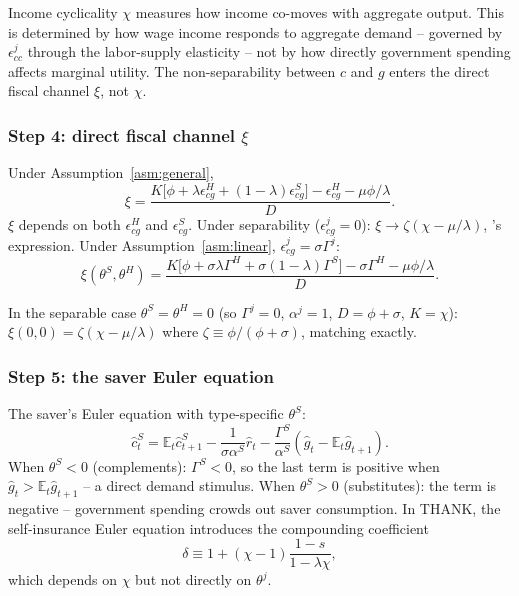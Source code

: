 \begin{remark}
Income cyclicality $\chi$ measures how \HtM{} income co-moves with aggregate
output. This is determined by how wage income responds to aggregate demand --
governed by $\epsilon^{j}_{cc}$ through the labor-supply elasticity -- not by
how directly government spending affects marginal utility. The non-separability
between $c$ and $g$ enters the direct fiscal channel $\xi$, not $\chi$.
\end{remark}

\subsubsection{Step 4: direct fiscal channel \texorpdfstring{$\xi$}{xi}}

\begin{proposition}\label{prop:xi-general}
Under Assumption~\ref{asm:general},
\begin{equation}\label{eq:xi-general}
  \xi=\frac{K\bigl[\phi+\lambda\epsilon^{H}_{cg}+(1-\lambda)\epsilon^{S}_{cg}\bigr]
          -\epsilon^{H}_{cg}-\mu\phi/\lambda}{D}.
\end{equation}
$\xi$ depends on both $\epsilon^{H}_{cg}$ and $\epsilon^{S}_{cg}$. Under
separability ($\epsilon^{j}_{cg}=0$): $\xi\rightarrow\zeta(\chi-\mu/\lambda)$,
\bilbiie{}'s expression.
Under Assumption~\ref{asm:linear}, $\epsilon^{j}_{cg}=\sigma\Gamma^{j}$:
\begin{equation}\label{eq:xi-linear}
  \xi(\theta^{S},\theta^{H})=
  \frac{K\bigl[\phi+\sigma\lambda\Gamma^{H}+\sigma(1-\lambda)\Gamma^{S}\bigr]
        -\sigma\Gamma^{H}-\mu\phi/\lambda}{D}.
\end{equation}
\end{proposition}

\noindent In the separable case $\theta^{S}=\theta^{H}=0$ (so $\Gamma^{j}=0$,
$\alpha^{j}=1$, $D=\phi+\sigma$, $K=\chi$):
$\xi(0,0)=\zeta(\chi-\mu/\lambda)$ where $\zeta\equiv\phi/(\phi+\sigma)$,
matching \citet{Bilbiie2025} exactly.

\subsubsection{Step 5: the saver Euler equation}
The saver's Euler equation with type-specific $\theta^{S}$:
\begin{equation}\label{eq:euler-linear}
  \hat c^{S}_{t}=\mathbb{E}_{t}\hat c^{S}_{t+1}
    -\frac{1}{\sigma\alpha^{S}}\hat r_{t}
    -\frac{\Gamma^{S}}{\alpha^{S}}(\hat g_{t}-\mathbb{E}_{t}\hat g_{t+1}).
\end{equation}
When $\theta^{S}<0$ (complements): $\Gamma^{S}<0$, so the last term is positive
when $\hat g_{t}>\mathbb{E}_{t}\hat g_{t+1}$ -- a direct demand stimulus. When
$\theta^{S}>0$ (substitutes): the term is negative -- government spending
crowds out saver consumption. In THANK, the self-insurance Euler equation
introduces the compounding coefficient
\begin{equation}\label{eq:delta}
  \delta\equiv 1+(\chi-1)\frac{1-s}{1-\lambda\chi},
\end{equation}
which depends on $\chi$ but not directly on $\theta^{j}$.

